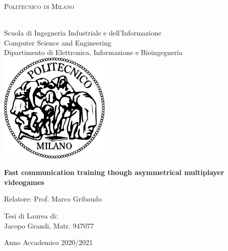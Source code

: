 \documentclass[12pt]{article}
\newcommand\blankpage{%
    \null
    \thispagestyle{empty}%
    \addtocounter{page}{-1}%
    \newpage}
\begin{document}
\setlength{\parindent}{0in}

\begin{titlepage}
\begin{center}

\begin{large} 
\textsc{Politecnico di Milano}
\end{large}
\\
Scuola di Ingegneria Industriale e dell’Informazione \\
Computer Science and Engineering \\
Dipartimento di Elettronica, Informazione e Bioingegneria \\

\vspace{0.8cm}
\includegraphics[width=0.4\textwidth]{poli}

\vspace{2cm}

\begin{Large}
\textbf{Fast communication training though asymmetrical multiplayer videogames}
\end{Large}

\vspace{2cm}

\begin{flushleft}
Relatore:
Prof. Marco Gribaudo
\end{flushleft}

\vspace{1cm}

\begin{flushright}
Tesi di Laurea di: \\
Jacopo Grandi, Matr. 947077
\end{flushright}

\vfill
Anno Accademico 2020/2021
\end{center}
\end{titlepage}

\clearpage

\afterpage{\blankpage}
\end{document}
